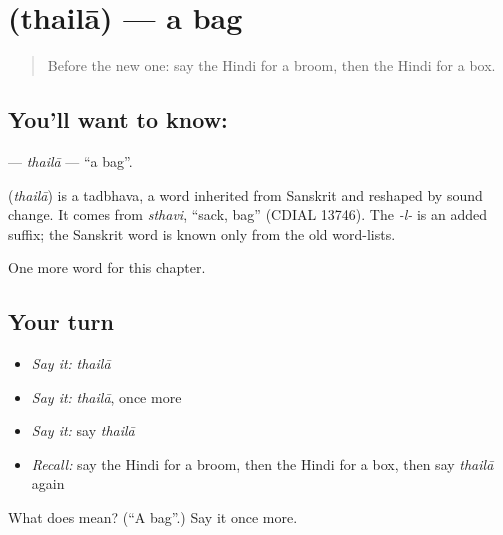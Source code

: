 \section[\texorpdfstring{\hi{थैला} (thailā)}{थैला (thailā)}]{ (thailā) — a bag}

\label{lesson:HI-C131-thaila}



\begin{quote}
Before the new one: say the Hindi for a broom, then the Hindi for a box.
\end{quote}

\subsection*{You'll want to know: }
\textbf{} — \emph{thailā} — \textquotedblleft{}a bag\textquotedblright{}.

\begin{cousinweb}
\textbf{} (\emph{thailā}) is a tadbhava, a word inherited from Sanskrit and reshaped by sound change. It comes from \emph{sthavi}, \textquotedblleft{}sack, bag\textquotedblright{} (CDIAL 13746). The \emph{-l-} is an added suffix; the Sanskrit word is known only from the old word-lists.
\end{cousinweb}

\begin{grammarlens}[title={What you've built}]
One more word for this chapter.
\end{grammarlens}

\subsection*{Your turn}
\begin{itemize}
\raggedright
  \item \emph{Say it:} \emph{thailā}
  \item \emph{Say it:} \emph{thailā}, once more
  \item \emph{Say it:} say \emph{thailā}
  \item \emph{Recall:} say the Hindi for a broom, then the Hindi for a box, then say \emph{thailā} again
\end{itemize}

\begin{tcolorbox}[breakable,colback=teal!4,colframe=teal!35!black,title={Before you move on}]
What does  mean? (\textquotedblleft{}A bag\textquotedblright{}.) Say it once more.
\end{tcolorbox}
